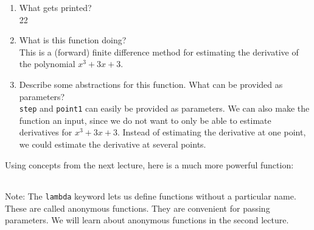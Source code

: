 \documentclass{article}
\newcounter{points}
\newcommand\printpoints{Total number of points: \thepoints}
\begin{document}
\begin{enumerate}
\begin{enumerate}
\item What gets printed? \\

22
\end{enumerate}

\begin{enumerate}
\setcounter{enumii}{1}
\item What is this function doing? \\

This is a (forward) finite difference method for estimating the derivative of the polynomial $x^3 + 3x + 3$.
\end{enumerate}

\begin{enumerate}
\setcounter{enumii}{2}
\item Describe some abstractions for this function.  What can be provided as parameters? \\

\texttt{step} and \texttt{point1} can easily be provided as parameters.  We can also make the function an input, since we do not want to only be able to estimate derivatives for $x^3 + 3x + 3$.  Instead of estimating the derivative at one point, we could estimate the derivative at several points.
\end{enumerate}

Using concepts from the next lecture, here is a much more powerful function:

\begin{center}
\begin{tabular}{c}

\end{tabular}
\end{center}

Note: The \texttt{lambda} keyword lets us define functions without a particular name.  These are called anonymous functions.  They are convenient for passing parameters.  We will learn about anonymous functions in the second lecture.

\end{enumerate}
\end{document}
